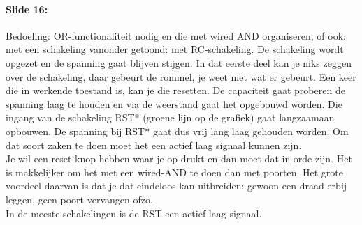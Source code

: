 \documentclass[10pt,a4paper]{book}
\begin{document}
\paragraph{Slide 16:} Bedoeling: OR-functionaliteit nodig en die met wired AND organiseren, of ook: met een schakeling vanonder getoond: met RC-schakeling. De schakeling wordt opgezet en de spanning gaat blijven stijgen. In dat eerste deel kan je niks zeggen over de schakeling, daar gebeurt de rommel, je weet niet wat er gebeurt. Een keer die in werkende toestand is, kan je die resetten. De capaciteit gaat proberen de spanning laag te houden en via de weerstand gaat het opgebouwd worden. Die ingang van de schakeling RST* (groene lijn op de grafiek) gaat langzaamaan opbouwen. De spanning bij RST* gaat dus vrij lang laag gehouden worden. Om dat soort zaken te doen moet het een actief laag signaal kunnen zijn. \\
Je wil een reset-knop hebben waar je op drukt en dan moet dat in orde zijn. Het is makkelijker om het met een wired-AND te doen dan met poorten. Het grote voordeel daarvan is dat je dat eindeloos kan uitbreiden: gewoon een draad erbij leggen, geen poort vervangen ofzo. \\
In de meeste schakelingen is de RST een actief laag signaal.
\end{document}
